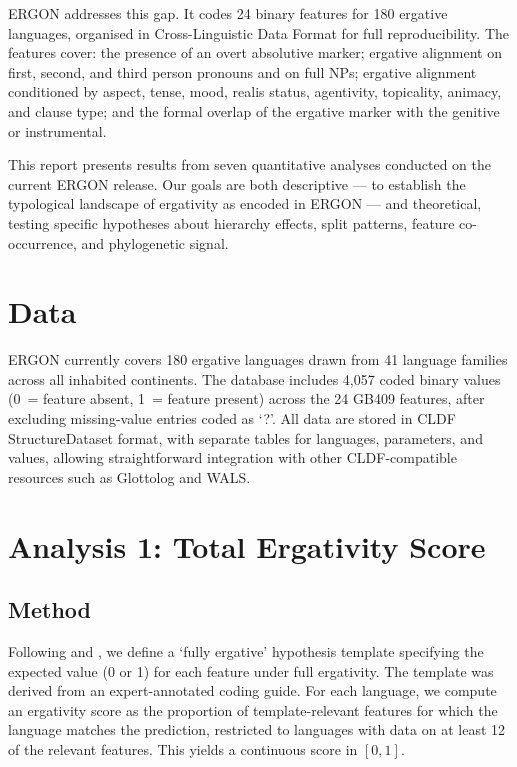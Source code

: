 \documentclass[12pt, a4paper]{article}
\begin{document}
ERGON addresses this gap. It codes 24 binary features for 180 ergative languages,
organised in Cross-Linguistic Data Format \citep[CLDF;][]{forkel2018} for full
reproducibility. The features cover: the presence of an overt absolutive marker;
ergative alignment on first, second, and third person pronouns and on full NPs;
ergative alignment conditioned by aspect, tense, mood, realis status, agentivity,
topicality, animacy, and clause type; and the formal overlap of the ergative
marker with the genitive or instrumental.

This report presents results from seven quantitative analyses conducted on the
current ERGON release. Our goals are both descriptive --- to establish the
typological landscape of ergativity as encoded in ERGON --- and theoretical,
testing specific hypotheses about hierarchy effects, split patterns, feature
co-occurrence, and phylogenetic signal.

\section{Data}

ERGON currently covers 180 ergative languages drawn from 41 language families
across all inhabited continents. The database includes 4,057 coded binary values
(0~= feature absent, 1~= feature present) across the 24 GB409 features, after
excluding missing-value entries coded as `?'. All data are stored in CLDF
StructureDataset format, with separate tables for languages, parameters, and
values, allowing straightforward integration with other CLDF-compatible resources
such as Glottolog and WALS.

\section{Analysis 1: Total Ergativity Score}

\subsection{Method}

Following \citet{greenhill2010} and \citet{blasi2019}, we define a
`fully ergative' hypothesis template specifying the expected value (0 or 1) for
each feature under full ergativity. The template was derived from an
expert-annotated coding guide. For each language, we compute an ergativity score
as the proportion of template-relevant features for which the language matches the
prediction, restricted to languages with data on at least 12 of the relevant
features. This yields a continuous score in $[0, 1]$.
\end{document}

